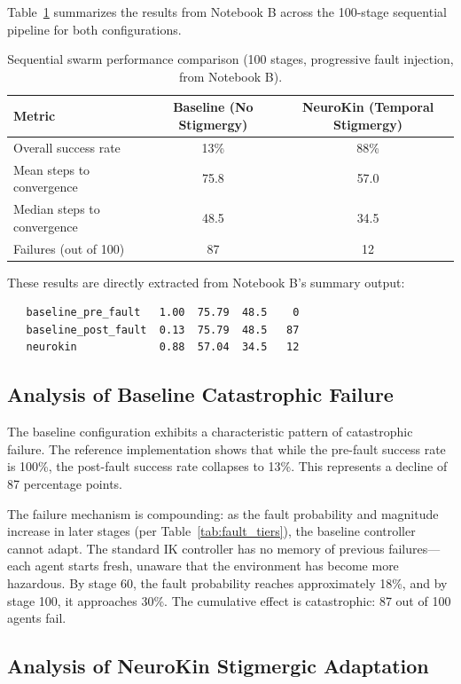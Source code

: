 \documentclass[12pt,a4paper,oneside]{report}
\begin{document}
Table~\ref{tab:swarm_results} summarizes the results from Notebook B across the 100-stage sequential pipeline for both configurations.

\begin{table}[H]
\centering
\caption{Sequential swarm performance comparison (100 stages, progressive fault injection, from Notebook B).}
\label{tab:swarm_results}
\begin{tabular}{lcc}
\toprule
\textbf{Metric} & \textbf{Baseline (No Stigmergy)} & \textbf{NeuroKin (Temporal Stigmergy)} \\
\midrule
Overall success rate & 13\% & 88\% \\
Mean steps to convergence & 75.8 & 57.0 \\
Median steps to convergence & 48.5 & 34.5 \\
Failures (out of 100) & 87 & 12 \\
\bottomrule
\end{tabular}
\end{table}

These results are directly extracted from Notebook B's summary output:

\begin{verbatim}
   baseline_pre_fault   1.00  75.79  48.5    0
   baseline_post_fault  0.13  75.79  48.5   87
   neurokin             0.88  57.04  34.5   12
\end{verbatim}

\subsection{Analysis of Baseline Catastrophic Failure}

The baseline configuration exhibits a characteristic pattern of catastrophic failure. The reference implementation shows that while the pre-fault success rate is 100\%, the post-fault success rate collapses to 13\%. This represents a decline of 87 percentage points.

The failure mechanism is compounding: as the fault probability and magnitude increase in later stages (per Table~\ref{tab:fault_tiers}), the baseline controller cannot adapt. The standard IK controller has no memory of previous failures—each agent starts fresh, unaware that the environment has become more hazardous. By stage 60, the fault probability reaches approximately 18\%, and by stage 100, it approaches 30\%. The cumulative effect is catastrophic: 87 out of 100 agents fail.

\subsection{Analysis of NeuroKin Stigmergic Adaptation}
\end{document}
